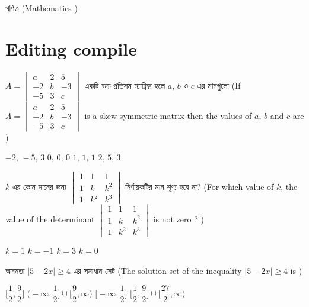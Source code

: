 \documentclass[addpoints]{exam}
\begin{document}
\begin{LARGE}
\begin{center}
গণিত (Mathematics )
\end{center}
\end{LARGE}
\chapter{Editing compile}
\begin{questions}

\question $ A=\begin{vmatrix}
a & 2 & 5 \\
-2 & b & -3 \\
-5 & 3 & c
\end{vmatrix} $  একটি বক্র প্রতিসম ম্যাট্রিক্স হলে $ a,\,b $ ও $ c $ এর মানগুলো (If $ A=\begin{vmatrix}
a & 2 & 5 \\
-2 & b & -3 \\
-5 & 3 & c
\end{vmatrix} $ is a skew symmetric matrix then the values of $ a,\,b $ and $ c $ are )

\begin{oneparchoices}
\choice  $-2,\, -5,\, 3$
\choice  $0,\, 0,\, 0$
\choice  $1,\, 1,\, 1$
\choice  $2,\, 5,\, 3$

\end{oneparchoices}

\question  $ k $ এর কোন মানের জন্য $ \begin{vmatrix}
1 & 1 & 1 \\
1 & k & k^2 \\
1 & k^2 & k^3
\end{vmatrix}  $ নির্ণায়কটির মান শূণ্য হবে না? (For which value of $ k $, the value of the  determinant $ \begin{vmatrix}
1 & 1 & 1 \\
1 & k & k^2 \\
1 & k^2 & k^3
\end{vmatrix}  $ is not zero ? )

\begin{oneparchoices}
\choice $ k=1 $
\choice $ k=-1 $
\choice $ k=3 $
\choice  $ k=0 $

\end{oneparchoices}
    

\question   অসমতা $ |5-2x|\ge 4 $ এর সমাধান সেট (The solution set of the  inequality $ |5-2x|\ge 4 $ is )

\begin{oneparchoices}
\choice $ \Big[ \dfrac{1}{2}, \dfrac{9}{2} \Big] $
\choice $ \Big(-\infty, \dfrac{1}{2} \Big] \cup \Big[\dfrac{9}{2}, \infty \Big)$ 
\choice $ \Big[ -\infty, \dfrac{1}{2} \Big] $
\choice  $ \Big[ \dfrac{1}{2}, \dfrac{9}{2} \Big]\cup \Big[ \dfrac{27}{2}, \infty \Big) $


\end{oneparchoices}
\end{questions}
\end{document}
